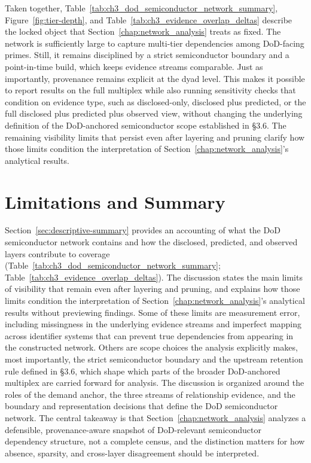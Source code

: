 Taken together, Table~\ref{tab:ch3_dod_semiconductor_network_summary}, Figure~\ref{fig:tier-depth}, and Table~\ref{tab:ch3_evidence_overlap_deltas} describe the locked object that Section~\ref{chap:network_analysis} treats as fixed. The network is sufficiently large to capture multi-tier dependencies among DoD-facing primes. Still, it remains disciplined by a strict semiconductor boundary and a point-in-time build, which keeps evidence streams comparable. Just as importantly, provenance remains explicit at the dyad level. This makes it possible to report results on the full multiplex while also running sensitivity checks that condition on evidence type, such as disclosed-only, disclosed plus predicted, or the full disclosed plus predicted plus observed view, without changing the underlying definition of the DoD-anchored semiconductor scope established in \S3.6. The remaining visibility limits that persist even after layering and pruning clarify how those limits condition the interpretation of Section~\ref{chap:network_analysis}'s analytical results.

\section{Limitations and Summary}

Section~\ref{sec:descriptive-summary} provides an accounting of what the DoD semiconductor network contains and how the disclosed, predicted, and observed layers contribute to coverage (Table~\ref{tab:ch3_dod_semiconductor_network_summary}; Table~\ref{tab:ch3_evidence_overlap_deltas}). The discussion states the main limits of visibility that remain even after layering and pruning, and explains how those limits condition the interpretation of Section~\ref{chap:network_analysis}'s analytical results without previewing findings. Some of these limits are measurement error, including missingness in the underlying evidence streams and imperfect mapping across identifier systems that can prevent true dependencies from appearing in the constructed network. Others are scope choices the analysis explicitly makes, most importantly, the strict semiconductor boundary and the upstream retention rule defined in \S3.6, which shape which parts of the broader DoD-anchored multiplex are carried forward for analysis. The discussion is organized around the roles of the demand anchor, the three streams of relationship evidence, and the boundary and representation decisions that define the DoD semiconductor network. The central takeaway is that Section~\ref{chap:network_analysis} analyzes a defensible, provenance-aware snapshot of DoD-relevant semiconductor dependency structure, not a complete census, and the distinction matters for how absence, sparsity, and cross-layer disagreement should be interpreted.

